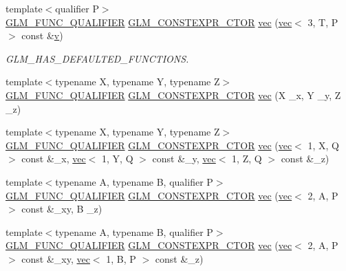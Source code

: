 \begin{DoxyCompactItemize}
{\footnotesize template$<$qualifier P$>$ }\\\hyperlink{setup_8hpp_a33fdea6f91c5f834105f7415e2a64407}{G\+L\+M\+\_\+\+F\+U\+N\+C\+\_\+\+Q\+U\+A\+L\+I\+F\+I\+ER} \hyperlink{setup_8hpp_ad34178a09666081abdb573c14d1f4a5a}{G\+L\+M\+\_\+\+C\+O\+N\+S\+T\+E\+X\+P\+R\+\_\+\+C\+T\+OR} \hyperlink{structglm_1_1vec_3_013_00_01_t_00_01_q_01_4_a16d0432ba5cb3aaef5e3657b8bf1c889}{vec} (\hyperlink{structglm_1_1vec}{vec}$<$ 3, T, P $>$ const \&\hyperlink{_s_d_l__opengl_8h_a10a82eabcb59d2fcd74acee063775f90}{v})
\begin{DoxyCompactList}\small\item\em G\+L\+M\+\_\+\+H\+A\+S\+\_\+\+D\+E\+F\+A\+U\+L\+T\+E\+D\+\_\+\+F\+U\+N\+C\+T\+I\+O\+NS. \end{DoxyCompactList}\item 
{\footnotesize template$<$typename X, typename Y, typename Z$>$ }\\\hyperlink{setup_8hpp_a33fdea6f91c5f834105f7415e2a64407}{G\+L\+M\+\_\+\+F\+U\+N\+C\+\_\+\+Q\+U\+A\+L\+I\+F\+I\+ER} \hyperlink{setup_8hpp_ad34178a09666081abdb573c14d1f4a5a}{G\+L\+M\+\_\+\+C\+O\+N\+S\+T\+E\+X\+P\+R\+\_\+\+C\+T\+OR} \hyperlink{structglm_1_1vec_3_013_00_01_t_00_01_q_01_4_a9bc7a2c03248c036f1edcd4d4d3e3e90}{vec} (X \+\_\+x, Y \+\_\+y, Z \+\_\+z)
\item 
{\footnotesize template$<$typename X, typename Y, typename Z$>$ }\\\hyperlink{setup_8hpp_a33fdea6f91c5f834105f7415e2a64407}{G\+L\+M\+\_\+\+F\+U\+N\+C\+\_\+\+Q\+U\+A\+L\+I\+F\+I\+ER} \hyperlink{setup_8hpp_ad34178a09666081abdb573c14d1f4a5a}{G\+L\+M\+\_\+\+C\+O\+N\+S\+T\+E\+X\+P\+R\+\_\+\+C\+T\+OR} \hyperlink{structglm_1_1vec_3_013_00_01_t_00_01_q_01_4_ae438a8844a761acd9174ec18eea6de5a}{vec} (\hyperlink{structglm_1_1vec}{vec}$<$ 1, X, Q $>$ const \&\+\_\+x, \hyperlink{structglm_1_1vec}{vec}$<$ 1, Y, Q $>$ const \&\+\_\+y, \hyperlink{structglm_1_1vec}{vec}$<$ 1, Z, Q $>$ const \&\+\_\+z)
\item 
{\footnotesize template$<$typename A, typename B, qualifier P$>$ }\\\hyperlink{setup_8hpp_a33fdea6f91c5f834105f7415e2a64407}{G\+L\+M\+\_\+\+F\+U\+N\+C\+\_\+\+Q\+U\+A\+L\+I\+F\+I\+ER} \hyperlink{setup_8hpp_ad34178a09666081abdb573c14d1f4a5a}{G\+L\+M\+\_\+\+C\+O\+N\+S\+T\+E\+X\+P\+R\+\_\+\+C\+T\+OR} \hyperlink{structglm_1_1vec_3_013_00_01_t_00_01_q_01_4_a611e956498c0d144b8ba94638e86fca9}{vec} (\hyperlink{structglm_1_1vec}{vec}$<$ 2, A, P $>$ const \&\+\_\+xy, B \+\_\+z)
\item 
{\footnotesize template$<$typename A, typename B, qualifier P$>$ }\\\hyperlink{setup_8hpp_a33fdea6f91c5f834105f7415e2a64407}{G\+L\+M\+\_\+\+F\+U\+N\+C\+\_\+\+Q\+U\+A\+L\+I\+F\+I\+ER} \hyperlink{setup_8hpp_ad34178a09666081abdb573c14d1f4a5a}{G\+L\+M\+\_\+\+C\+O\+N\+S\+T\+E\+X\+P\+R\+\_\+\+C\+T\+OR} \hyperlink{structglm_1_1vec_3_013_00_01_t_00_01_q_01_4_ae95dab82b1cb879409d72da36d6c6005}{vec} (\hyperlink{structglm_1_1vec}{vec}$<$ 2, A, P $>$ const \&\+\_\+xy, \hyperlink{structglm_1_1vec}{vec}$<$ 1, B, P $>$ const \&\+\_\+z)

\end{DoxyCompactItemize}
